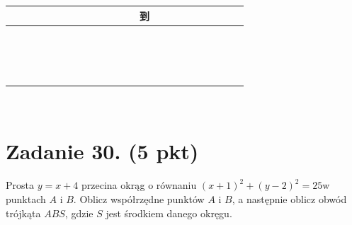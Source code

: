 \documentclass[10pt]{article}
\begin{document}
\begin{center}
\begin{tabular}{|c|c|c|c|c|c|c|c|c|c|c|c|c|c|c|c|c|c|c|c|c|c|c|}
\hline
 &  &  &  &  &  &  &  &  &  &  &  &  & 到 &  &  &  &  &  &  &  &  &  \\
\hline
 &  &  &  &  &  &  &  &  &  &  &  &  &  &  &  &  &  &  &  &  &  &  \\
\hline
 &  &  &  &  &  &  &  &  &  &  &  &  &  &  &  &  &  &  &  &  &  &  \\
\hline
 &  &  &  &  &  &  &  &  &  &  &  &  &  &  &  &  &  &  &  &  &  &  \\
\hline
 &  &  &  &  &  &  &  &  &  &  &  &  &  &  &  &  &  &  &  &  &  &  \\
\hline
 &  &  &  &  &  &  &  &  &  &  &  &  &  &  &  &  &  &  &  &  &  &  \\
\hline
 &  &  &  &  &  &  &  &  &  &  &  &  &  &  &  &  &  &  &  &  &  &  \\
\hline
 &  &  &  &  &  &  &  &  &  &  &  &  &  &  &  &  &  &  &  &  &  &  \\
\hline
 &  &  &  &  &  &  &  &  &  &  &  &  &  &  &  &  &  &  &  &  &  &  \\
\hline
 &  &  &  &  &  &  &  &  &  &  &  &  &  &  &  &  &  &  &  &  &  &  \\
\hline
 &  &  &  &  &  &  &  &  &  &  &  &  &  &  &  &  &  &  &  &  &  &  \\
\hline
 &  &  &  &  &  &  &  &  &  &  &  &  &  &  &  &  &  &  &  &  &  &  \\
\hline
 &  &  &  &  &  &  &  &  &  &  &  &  &  &  &  &  &  &  &  &  &  &  \\
\hline
 &  &  &  &  &  &  &  &  &  &  &  &  &  &  &  &  &  &  &  &  &  &  \\
\hline
 &  &  &  &  &  &  &  &  &  &  &  &  &  &  &  &  &  &  &  &  &  &  \\
\hline
 &  &  &  &  &  &  &  &  &  &  &  &  &  &  &  &  &  &  &  &  &  &  \\
\hline
 &  &  &  &  &  &  &  &  &  &  &  &  &  &  &  &  &  &  &  &  &  &  \\
\hline
\end{tabular}
\end{center}

\(\qquad\)

\section*{Zadanie 30. (5 pkt)}
Prosta \(y=x+4\) przecina okrąg o równaniu \((x+1)^{2}+(y-2)^{2}=25 \mathrm{w}\) punktach \(A\) i \(B\). Oblicz współrzędne punktów \(A\) i \(B\), a następnie oblicz obwód trójkąta \(A B S\), gdzie \(S\) jest środkiem danego okręgu.
\end{document}
